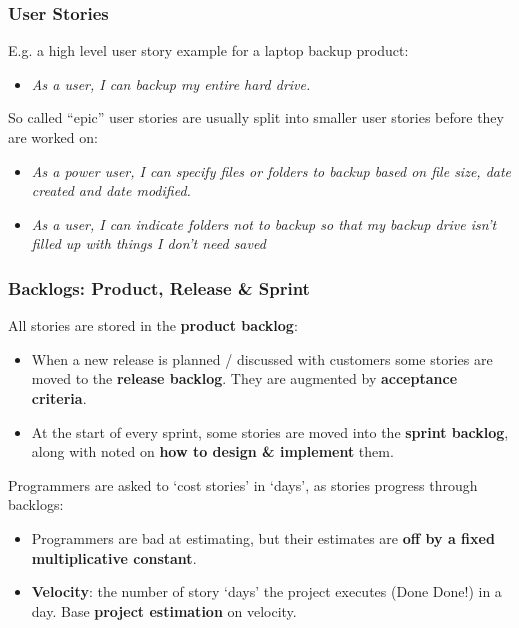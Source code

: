 \documentclass{beamer} %
\newcommand\emc[1]{\textcolor{midred}{\textbf{#1}}}
\begin{document}
\begin{frame}
  \frametitle{User Stories}
  E.g. a high level user story example for a laptop backup product:

  \begin{itemize}
  \item {\em As a user, I can backup my entire hard drive.}
    \end{itemize}

  So called ``epic'' user stories are usually split into smaller user stories before they are worked on:
  \begin{itemize}
   \item {\em As a power user, I can specify files or folders to backup based on file size, date created and date modified.}
   \item {\em As a user, I can indicate folders not to backup so that my backup drive isn't filled up with things I don't need saved}
  \end{itemize}
\end{frame}


\begin{frame}

\frametitle{Backlogs: Product, Release \& Sprint}

All stories are stored in the \emc{product backlog}:
\begin{itemize}
  \item When a new release is planned / discussed with customers some stories are moved to the \emc{release backlog}. They are augmented by \emc{acceptance criteria}.
  \item At the start of every sprint, some stories are moved into the \emc{sprint backlog}, along with noted on \emc{how to design \& implement} them.
  \end{itemize}

Programmers are asked to `cost stories' in `days', as stories progress through backlogs:
\begin{itemize}
  \item Programmers are bad at estimating, but their estimates are \emc{off by a fixed multiplicative constant}.
  \item \emc{Velocity}: the number of story `days' the project executes (Done Done!) in a day. Base \emc{project estimation} on velocity.
\end{itemize} 

\end{frame}
\end{document}
